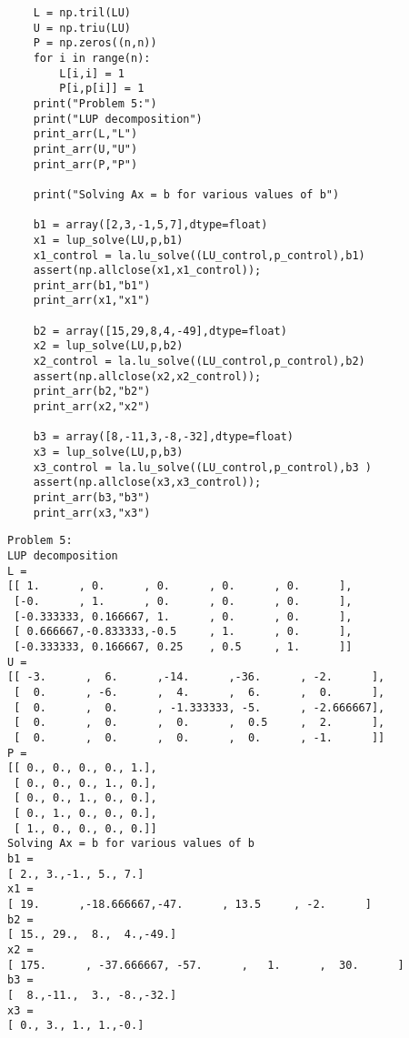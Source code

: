 \documentclass[11pt]{article}
\begin{document}
\begin{enumerate}
\begin{verbatim}
    L = np.tril(LU)
    U = np.triu(LU)
    P = np.zeros((n,n))
    for i in range(n):
        L[i,i] = 1
        P[i,p[i]] = 1
    print("Problem 5:")
    print("LUP decomposition")
    print_arr(L,"L")
    print_arr(U,"U")
    print_arr(P,"P")

    print("Solving Ax = b for various values of b")

    b1 = array([2,3,-1,5,7],dtype=float)
    x1 = lup_solve(LU,p,b1)
    x1_control = la.lu_solve((LU_control,p_control),b1)
    assert(np.allclose(x1,x1_control));
    print_arr(b1,"b1")
    print_arr(x1,"x1")

    b2 = array([15,29,8,4,-49],dtype=float)
    x2 = lup_solve(LU,p,b2)
    x2_control = la.lu_solve((LU_control,p_control),b2)
    assert(np.allclose(x2,x2_control));
    print_arr(b2,"b2")
    print_arr(x2,"x2")

    b3 = array([8,-11,3,-8,-32],dtype=float)
    x3 = lup_solve(LU,p,b3)
    x3_control = la.lu_solve((LU_control,p_control),b3 )
    assert(np.allclose(x3,x3_control));
    print_arr(b3,"b3")
    print_arr(x3,"x3")
\end{verbatim}
\begin{verbatim}
Problem 5:
LUP decomposition
L =
[[ 1.      , 0.      , 0.      , 0.      , 0.      ],
 [-0.      , 1.      , 0.      , 0.      , 0.      ],
 [-0.333333, 0.166667, 1.      , 0.      , 0.      ],
 [ 0.666667,-0.833333,-0.5     , 1.      , 0.      ],
 [-0.333333, 0.166667, 0.25    , 0.5     , 1.      ]]
U =
[[ -3.      ,  6.      ,-14.      ,-36.      , -2.      ],
 [  0.      , -6.      ,  4.      ,  6.      ,  0.      ],
 [  0.      ,  0.      , -1.333333, -5.      , -2.666667],
 [  0.      ,  0.      ,  0.      ,  0.5     ,  2.      ],
 [  0.      ,  0.      ,  0.      ,  0.      , -1.      ]]
P =
[[ 0., 0., 0., 0., 1.],
 [ 0., 0., 0., 1., 0.],
 [ 0., 0., 1., 0., 0.],
 [ 0., 1., 0., 0., 0.],
 [ 1., 0., 0., 0., 0.]]
Solving Ax = b for various values of b
b1 =
[ 2., 3.,-1., 5., 7.]
x1 =
[ 19.      ,-18.666667,-47.      , 13.5     , -2.      ]
b2 =
[ 15., 29.,  8.,  4.,-49.]
x2 =
[ 175.      , -37.666667, -57.      ,   1.      ,  30.      ]
b3 =
[  8.,-11.,  3., -8.,-32.]
x3 =
[ 0., 3., 1., 1.,-0.]
\end{verbatim}
\end{enumerate}
\end{document}
